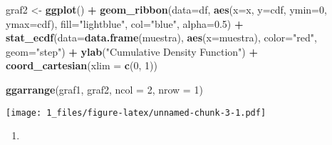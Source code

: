 \documentclass[
]{article}
\newenvironment{Shaded}{\begin{snugshade}}{\end{snugshade}}
\newcommand{\DataTypeTok}[1]{\textcolor[rgb]{0.13,0.29,0.53}{#1}}
\newcommand{\DecValTok}[1]{\textcolor[rgb]{0.00,0.00,0.81}{#1}}
\newcommand{\FloatTok}[1]{\textcolor[rgb]{0.00,0.00,0.81}{#1}}
\newcommand{\KeywordTok}[1]{\textcolor[rgb]{0.13,0.29,0.53}{\textbf{#1}}}
\newcommand{\NormalTok}[1]{#1}
\newcommand{\OperatorTok}[1]{\textcolor[rgb]{0.81,0.36,0.00}{\textbf{#1}}}
\newcommand{\StringTok}[1]{\textcolor[rgb]{0.31,0.60,0.02}{#1}}
\begin{document}
\begin{Shaded}
\begin{Highlighting}[]
\NormalTok{graf2 <-}\StringTok{ }\KeywordTok{ggplot}\NormalTok{() }\OperatorTok{+}
\StringTok{  }\KeywordTok{geom_ribbon}\NormalTok{(}\DataTypeTok{data=}\NormalTok{df, }\KeywordTok{aes}\NormalTok{(}\DataTypeTok{x=}\NormalTok{x, }\DataTypeTok{y=}\NormalTok{cdf, }\DataTypeTok{ymin=}\DecValTok{0}\NormalTok{, }\DataTypeTok{ymax=}\NormalTok{cdf),}
              \DataTypeTok{fill=}\StringTok{"lightblue"}\NormalTok{, }\DataTypeTok{col=}\StringTok{"blue"}\NormalTok{, }\DataTypeTok{alpha=}\FloatTok{0.5}\NormalTok{) }\OperatorTok{+}
\StringTok{  }\KeywordTok{stat_ecdf}\NormalTok{(}\DataTypeTok{data=}\KeywordTok{data.frame}\NormalTok{(muestra), }\KeywordTok{aes}\NormalTok{(}\DataTypeTok{x=}\NormalTok{muestra), }\DataTypeTok{color=}\StringTok{"red"}\NormalTok{, }\DataTypeTok{geom=}\StringTok{"step"}\NormalTok{) }\OperatorTok{+}
\StringTok{  }\KeywordTok{ylab}\NormalTok{(}\StringTok{"Cumulative Density Function"}\NormalTok{) }\OperatorTok{+}
\StringTok{  }\KeywordTok{coord_cartesian}\NormalTok{(}\DataTypeTok{xlim =} \KeywordTok{c}\NormalTok{(}\DecValTok{0}\NormalTok{, }\DecValTok{1}\NormalTok{))}

\KeywordTok{ggarrange}\NormalTok{(graf1, graf2, }\DataTypeTok{ncol =} \DecValTok{2}\NormalTok{, }\DataTypeTok{nrow =} \DecValTok{1}\NormalTok{)}
\end{Highlighting}
\end{Shaded}

\texttt{[image: 1\_files/figure-latex/unnamed-chunk-3-1.pdf]}

\begin{enumerate}
\def\labelenumi{\alph{enumi})}
\setcounter{enumi}{2}
\item
\end{enumerate}
\end{document}

